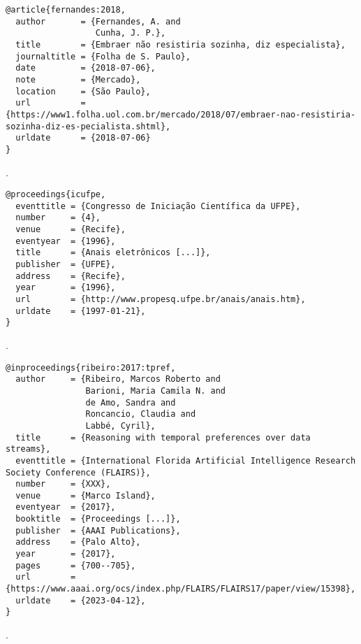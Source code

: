 \begin{verbatim}
@article{fernandes:2018,
  author       = {Fernandes, A. and
                  Cunha, J. P.},
  title        = {Embraer não resistiria sozinha, diz especialista},
  journaltitle = {Folha de S. Paulo},
  date         = {2018-07-06},
  note         = {Mercado},
  location     = {São Paulo},
  url          = {https://www1.folha.uol.com.br/mercado/2018/07/embraer-nao-resistiria-sozinha-diz-es-pecialista.shtml},
  urldate      = {2018-07-06}
}
\end{verbatim}

\noindent
{}.

\vspace*{1em}

\begin{verbatim}
@proceedings{icufpe,
  eventtitle = {Congresso de Iniciação Científica da UFPE},
  number     = {4},
  venue      = {Recife},
  eventyear  = {1996},
  title      = {Anais eletrônicos [...]},
  publisher  = {UFPE},
  address    = {Recife},
  year       = {1996},
  url        = {http://www.propesq.ufpe.br/anais/anais.htm},
  urldate    = {1997-01-21},
}
\end{verbatim}

\noindent
{}.

\vspace*{1em}

\begin{verbatim}
@inproceedings{ribeiro:2017:tpref,
  author     = {Ribeiro, Marcos Roberto and
                Barioni, Maria Camila N. and
                de Amo, Sandra and
                Roncancio, Claudia and
                Labbé, Cyril},
  title      = {Reasoning with temporal preferences over data streams},
  eventtitle = {International Florida Artificial Intelligence Research Society Conference (FLAIRS)},
  number     = {XXX},
  venue      = {Marco Island},
  eventyear  = {2017},
  booktitle  = {Proceedings [...]},
  publisher  = {AAAI Publications},
  address    = {Palo Alto},
  year       = {2017},
  pages      = {700--705},
  url        = {https://www.aaai.org/ocs/index.php/FLAIRS/FLAIRS17/paper/view/15398},
  urldate    = {2023-04-12},
}
\end{verbatim}

\noindent
{}.

